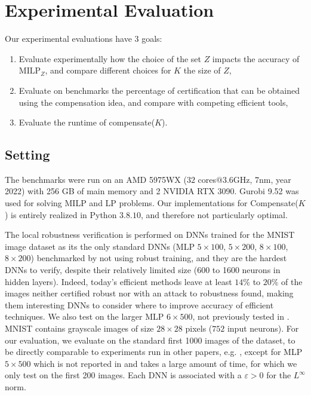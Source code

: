 \documentclass{llncs}
\newcommand{\MILP}{{\textrm{MILP}}}
\begin{document}
\section{Experimental Evaluation}

Our experimental evaluations have 3 goals:
\begin{enumerate}
  \item Evaluate experimentally how the choice of the set $Z$ impacts the accuracy of $\MILP_Z$, and compare different choices for $K$ the size of $Z$,
  \item Evaluate on benchmarks the percentage of certification that can be obtained
 using the compensation idea, and compare with competing efficient tools,
  \item Evaluate the runtime of compensate($K$).
\end{enumerate}

\subsection{Setting}
The benchmarks were run on an AMD 5975WX ($32$ cores$@3.6$GHz, 7nm, year 2022) with 256 GB of main memory and 2 NVIDIA RTX 3090. Gurobi 9.52 was used for solving MILP and LP problems. Our implementations for Compensate($K$) is entirely realized in Python 
$3.8.10$, and therefore not particularly optimal.

The local robustness verification is performed on DNNs trained for the MNIST image dataset as its the only standard DNNs (MLP $5\times 100$, $5\times 200$, $8 \times 100$, $8 \times 200$) benchmarked by \cite{crown} not using robust training, and they are the hardest DNNs to verify, despite their relatively limited size (600 to 1600 neurons in hidden layers). Indeed, today's efficient methods leave at least $14\%$ to $20\%$ of the images neither certified robust nor with an attack to robustness found, making them interesting DNNs to consider where to improve accuracy of efficient techniques. We also test on the larger MLP $6\times 500$, not previously tested in \cite{crown}. MNIST contains grayscale images of size $28 \times 28$ pixels ($752$ input neurons). For our evaluation, we evaluate on the standard first 1000 images of the dataset, to be directly comparable to experiments run in other papers, e.g. \cite{prima,crown}, except for MLP $5\times 500$ which is not reported in \cite{prima,crown} and takes a large amount of time, for which we only test on the first 200 images. Each DNN is associated with a $\varepsilon>0$ for the $L^\infty$ norm.
\end{document}
